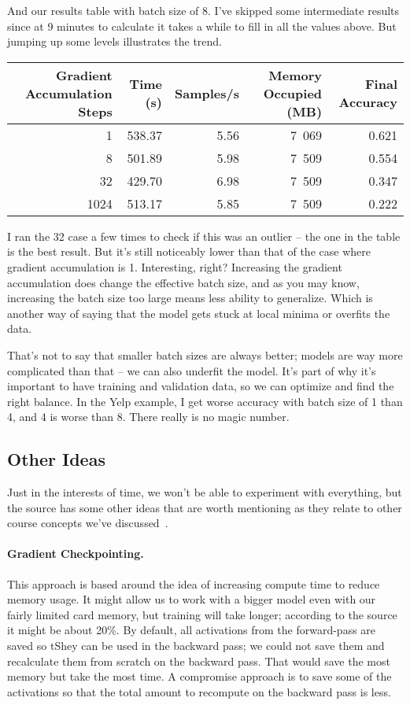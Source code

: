 And our results table with batch size of 8. I've skipped some intermediate results since at 9 minutes to calculate it takes a while to fill in all the values above. But jumping up some levels illustrates the trend.

\begin{center}
\begin{tabular}{r|r|r|r|r}
\textbf{Gradient Accumulation Steps} & \textbf{Time (s)} & \textbf{Samples/s} & \textbf{Memory Occupied (MB)} & \textbf{Final Accuracy}\\ \hline
1 & 538.37 & 5.56 & 7~069 & 0.621 \\
8 & 501.89 & 5.98 & 7~509 & 0.554 \\
32 & 429.70 & 6.98 & 7~509 & 0.347 \\
1024 & 513.17 & 5.85 & 7~509 & 0.222 \\
\end{tabular}
\end{center}

I ran the 32 case a few times to check if this was an outlier -- the one in the table is the best result. But it's still noticeably lower than that of the case where gradient accumulation is 1. Interesting, right? Increasing the gradient accumulation does change the effective batch size, and as you may know, increasing the batch size too large means less ability to generalize. Which is another way of saying that the model gets stuck at local minima or overfits the data.

That's not to say that smaller batch sizes are always better; models are way more complicated than that -- we can also underfit the model. It's part of why it's important to have training and validation data, so we can optimize and find the right balance. In the Yelp example, I get worse accuracy with batch size of 1 than 4, and 4 is worse than 8. There really is no magic number.

\subsection*{Other Ideas}
Just in the interests of time, we won't be able to experiment with everything, but the source has some other ideas that are worth mentioning as they relate to other course concepts we've discussed~\cite{hf}.

\paragraph{Gradient Checkpointing.} This approach is based around the idea of increasing compute time to reduce memory usage. It might allow us to work with a bigger model even with our fairly limited card memory, but training will take longer; according to the source it might be about 20\%. By default, all activations from the forward-pass are saved so tShey can be used in the backward pass; we could not save them and recalculate them from scratch on the backward pass. That would save the most memory but take the most time. A compromise approach is to save some of the activations so that the total amount to recompute on the backward pass is less. 

